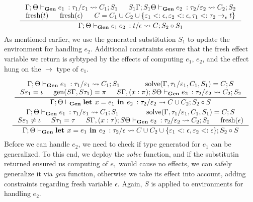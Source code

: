 \documentclass[declaration,shortabstract]{iithesis}
\theoremstyle{definition} \newtheorem{definition}{Definition}[section]
\newcommand{\gens}[6][\Gamma;\Theta]{\ensuremath{{{#1} \vdash_\textbf{Gen} {#2} \: : {#3}/{#4}} \rightsquigarrow {#5};{#6}}}
\newcommand{\arrow}[3]{{#1}\rightarrow_{#2}{#3}}
\newcommand{\fresh}[1]{\ensuremath{\operatorname{fresh}({#1})}}
\begin{document}
\begin{gather*}
\inference{
    \gens{e_1}{\tau_1}{\varepsilon_1}{C_1}{S_1} &
    \gens[S_1\Gamma;S_1\Theta]{e_2}{\tau_2}{\varepsilon_2}{C_2}{S_2} \\
    \fresh{t} &
    \fresh{\epsilon} &
    C = C_1 \cup C_2 \cup \{\varepsilon_1 <: \epsilon ,
    \varepsilon_2 <: \epsilon, \tau_1 <: \arrow{\tau_2}{\epsilon}{t} \}
}{
    \gens{e_1\:e_2}{t}{\epsilon}{C
    }{S_2 \circ S_1}
}
\end{gather*}
As mentioned earlier, we use the generated substitution $S_1$ to update the
environment for handling $e_2$.
Additional constraints ensure that the fresh effect variable we return is sybtyped by 
the effects of computing $e_1$, $e_2$, and the effect hung on the $\rightarrow$ type of $e_1$.

\begin{gather*}
\inference{
    \gens{e_1}{\tau_1}{\varepsilon_1}{C_1}{S_1} &
    \operatorname{solve}(\Gamma,\tau_1/\varepsilon_1, C_1, S_1) =  C; S \\
    S \varepsilon_1 = \iota &
    \operatorname{gen}(S\Gamma, S\tau_1) = \pi &
    \gens[S\Gamma,(x:\pi);S\Theta]{e_2}{\tau_2}{\varepsilon_2}{C_2}{S_2}
}{
    \gens{\textbf{let } x = e_1 \textbf{ in } e_2}{\tau_2}{\varepsilon_2}{C\cup C_2}{S_2 \circ S}
}
\\
\inference{
    \gens{e_1}{\tau_1}{\varepsilon_1}{C_1}{S_1} &
    \operatorname{solve}(\Gamma,\tau_1/\varepsilon_1, C_1, S_1) =  C; S \\
    S \varepsilon_1 \neq \iota &
    S \tau_1 = \tau &
    \gens[S\Gamma,(x:\tau);S\Theta]{e_2}{\tau_2}{\varepsilon_2}{C_2}{S_2} &
    \fresh{\epsilon}
}{
    \gens{\textbf{let } x = e_1 \textbf{ in } e_2}{\tau_2}{\epsilon}{C\cup C_2
    \cup \{ \varepsilon_1 <: \epsilon, \varepsilon_2 <: \epsilon\}}{S_2 \circ S}
}
\end{gather*}
Before we can handle $e_2$, we need to check if type generatod for $e_1$ can be generalized.
To this end, we deploy the \textit{solve} function, and if the substitutin returned
ensured us computing of $e_1$ would cause no effects, we can safely generalize it via \textit{gen} function,
otherwise we take its effect into account, adding constraints regarding fresh variable $\epsilon$.
Again, $S$ is applied to environments for handling $e_2$.
\end{document}
